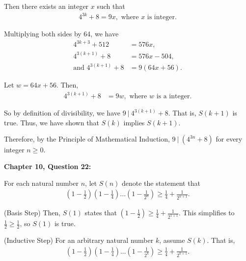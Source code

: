 \documentclass[12pt]{article}
\begin{document}
Then there exists an integer $x$ such that
\begin{align*}
    4^{3k} + 8 = 9x, \text{ where $x$ is integer.}
\end{align*}

Multiplying both sides by 64, we have
\begin{align*}
    4^{3k+3} + 512             & = 576x,        \\
    4^{3(k+1)} + 8             & = 576x - 504,  \\
    \text{and } 4^{3(k+1)} + 8 & = 9(64x + 56).
\end{align*}

Let $w= 64x+56$. Then,
\begin{align*}
    4^{3(k+1)} + 8 & = 9w, \text{ where $w$ is a integer.}
\end{align*}

So by definition of divisibility, we have $9 ~|~ 4^{3(k+1)} + 8$.
That is, $S(k+1)$ is true. Thus, we have shown that $S(k)$ implies $S(k+1)$.

Therefore, by the Principle of Mathematical Induction, $9 ~|~ (4^{3n}+8)$ for every integer $n\geq0$.

\noindent \textbf{Chapter 10, Question 22:}

For each natural number $n$, let $S(n)$ denote the statement that
\begin{align*}
    \left(1-\frac{1}{2}\right)\left(1-\frac{1}{4}\right)...\left(1-\frac{1}{2^n}\right) \geq{} \frac{1}{4} + \frac{1}{2^{n+1}}.
\end{align*}

(Basis Step) Then, $S(1)$ states that $(1-\frac{1}{2}) \geq \frac{1}{4} + \frac{1}{2^{1+1}}$.
This simplifies to $\frac{1}{2} \geq \frac{1}{2}$, so $S(1)$ is true.

(Inductive Step) For an arbitrary natural number $k$, assume $S(k)$. That is,
\begin{align*}
    \left(1-\frac{1}{2}\right)\left(1-\frac{1}{4}\right)...\left(1-\frac{1}{2^k}\right) \geq{} \frac{1}{4} + \frac{1}{2^{k+1}}.
\end{align*}
\end{document}
